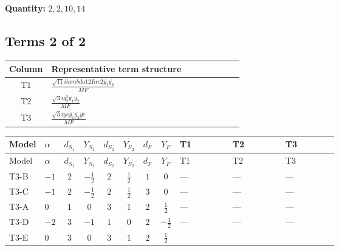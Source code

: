 \documentclass[8pt]{article}
\begin{document}
\begin{landscape}
\begin{longtable}{@{}llcccccc >{\raggedright\arraybackslash}p{0.21\linewidth} >{\raggedright\arraybackslash}p{0.21\linewidth} >{\raggedright\arraybackslash}p{0.21\linewidth}@{}}
\midrule
\bottomrule
\end{longtable}
\clearpage
\noindent\textbf{Quantity: }$\mathrm{2,2,10,14}$\par\smallskip
\subsection*{Terms 2 of 2}
\begin{center}
\begin{tabular}{@{}c >{\raggedright\arraybackslash}p{0.82\linewidth}@{}}
\toprule
Column & Representative term structure \\
\midrule
T1 & \(\displaystyle \frac{\sqrt{11} i lambda12Inv2 \overline{y_{1}} \overline{y_{2}}}{MF}\) \\
\midrule
T2 & \(\displaystyle \frac{\sqrt{3} i g_{2}^{2} \overline{y_{1}} \overline{y_{2}}}{MF}\) \\
\midrule
T3 & \(\displaystyle \frac{\sqrt{3} i ye \overline{y_{1}} \overline{y_{2}} \overline{ye}}{MF}\) \\
\midrule
\bottomrule
\end{tabular}
\end{center}
\smallskip
\tiny
\begin{longtable}{@{}llcccccc >{\raggedright\arraybackslash}p{0.21\linewidth} >{\raggedright\arraybackslash}p{0.21\linewidth} >{\raggedright\arraybackslash}p{0.21\linewidth}@{}}
\toprule
Model & $\alpha$ & $d_{S_1}$ & $Y_{S_1}$ & $d_{S_2}$ & $Y_{S_2}$ & $d_F$ & $Y_F$ & T1 & T2 & T3 \\
\midrule
\endfirsthead
\toprule
Model & $\alpha$ & $d_{S_1}$ & $Y_{S_1}$ & $d_{S_2}$ & $Y_{S_2}$ & $d_F$ & $Y_F$ & T1 & T2 & T3 \\
\midrule
\endhead
T3-B & $-1$ & $2$ & $-\frac{1}{2}$ & $2$ & $\frac{1}{2}$ & $1$ & $0$ & --- & --- & --- \\
\midrule
T3-C & $-1$ & $2$ & $-\frac{1}{2}$ & $2$ & $\frac{1}{2}$ & $3$ & $0$ & --- & --- & --- \\
\midrule
T3-A & $0$ & $1$ & $0$ & $3$ & $1$ & $2$ & $\frac{1}{2}$ & --- & --- & --- \\
\midrule
T3-D & $-2$ & $3$ & $-1$ & $1$ & $0$ & $2$ & $-\frac{1}{2}$ & --- & --- & --- \\
\midrule
T3-E & $0$ & $3$ & $0$ & $3$ & $1$ & $2$ & $\frac{1}{2}$ & \scriptsize\adjustbox{max width=\linewidth}{$\begin{gathered} \frac{3 \sqrt{11} i lambda12Inv2 \overline{y_{1}} \overline{y_{2}}}{22 MF}\end{gathered}$} & \scriptsize\adjustbox{max width=\linewidth}{$\begin{gathered} \frac{11 \sqrt{3} i g_{2}^{2} \overline{y_{1}} \overline{y_{2}}}{8 MF}\end{gathered}$} & \scriptsize\adjustbox{max width=\linewidth}{$\begin{gathered} - \frac{\sqrt{3} i ye \overline{y_{1}} \overline{y_{2}} \overline{ye}}{12 MF}\end{gathered}$} \\

\end{longtable}
\end{landscape}
\end{document}
